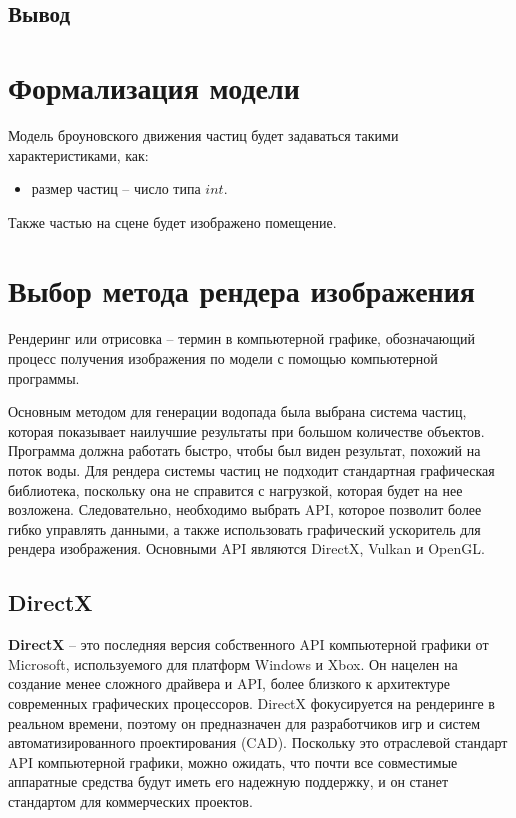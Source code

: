 \subsection*{Вывод}

\newpage

\section{Формализация модели}
Модель броуновского движения частиц будет задаваться такими характеристиками, как:
\begin{itemize} 
    \item размер частиц -- число типа $int$.
\end{itemize}

Также частью на сцене будет изображено помещение. 


\section{Выбор метода рендера изображения}

Рендеринг или отрисовка -- термин в компьютерной графике, обозначающий процесс получения изображения по модели с помощью компьютерной программы.

Основным методом для генерации водопада была выбрана система частиц, которая показывает наилучшие результаты при большом количестве объектов. Программа должна работать быстро, чтобы был виден результат, похожий на поток воды. Для рендера системы частиц не подходит стандартная графическая библиотека, поскольку она не справится с нагрузкой, которая будет на нее возложена. Следовательно, необходимо выбрать API, которое позволит более гибко управлять данными, а также использовать графический ускоритель для рендера изображения. Основными API являются DirectX, Vulkan и OpenGL.

\subsection{DirectX}

\textbf{DirectX} -- это последняя версия собственного API компьютерной графики от Microsoft, используемого для платформ Windows и Xbox. Он нацелен на создание менее сложного драйвера и API, более близкого к архитектуре современных графических процессоров. DirectX фокусируется на рендеринге в реальном времени, поэтому он предназначен для разработчиков игр и систем автоматизированного проектирования (CAD). Поскольку это отраслевой стандарт API компьютерной графики, можно ожидать, что почти все совместимые аппаратные средства будут иметь его надежную поддержку, и он станет стандартом для коммерческих проектов.

